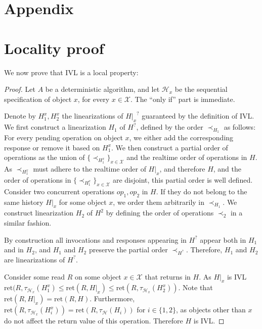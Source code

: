 

\pagestyle{empty}

\section*{Appendix}

\section{Locality proof}
\label{ivl-sec:locality-proof}
We now prove that IVL is a local property:
\local
\begin{proof}
    Let $A$ be a deterministic algorithm, and let $\mathcal{H}_x$ be the sequential specification of object $x$, for every $x \in \mathcal{X}$.
    The ``only if'' part is immediate.
  
    Denote by ${H_1^x}, {H_2^x}$ the linearizations of ${H|_x}^?$ guaranteed by the
    definition of IVL.
    We first construct a linearization $H_1$ of $H^?$, defined
    by the order $\prec_{H_1}$ as follows: For every pending operation on object $x$, we either
    add the corresponding response or remove it based on ${H_1^x}$. We then construct a partial order
    of operations as the union of $\{{\prec}_{H_1^x}\}_{x \in \mathcal{X}}$ and the realtime order
    of operations in $H$. As ${\prec}_{H_1^x}$ must adhere to the realtime order of $H|_x$,
    and therefore $H$, and the order of operations in $\{{\prec}_{H_1^x}\}_{x \in \mathcal{X}}$ are disjoint, this partial order
    is well defined. Consider two concurrent operations $op_1, op_2$ in $H$. If they
    do not belong to the same history $H|_x$ for some object $x$, we order them arbitrarily in $\prec_{H_1}$.
    We construct linearization $H_2$ of $H^2$ by defining the order of operations $\prec_2$ in a similar fashion.
  
    By construction all invocations and responses appearing in $H^?$ appear both in $H_1$ and in $H_2$,
    and $H_1$ and $H_2$ preserve the partial order $\prec_{H^?}$. Therefore, $H_1$ and $H_2$ are linearizations
    of $H^?$.
    
    Consider some read $R$ on some object $x \in \mathcal{X}$ that returns in $H$. As $H|_x$ is IVL
    $\text{ret}(R,  \tau_{\mathcal{H}_x}(H_1^x) \leq \text{ret}(R, H|_x) \leq \text{ret}(R, \tau_{\mathcal{H}_x}(H_2^x))$.
    Note that $\text{ret}(R, H|_x) = \text{ret}(R, H)$. Furthermore, $\text{ret}(R, \tau_{\mathcal{H}_x}(H_i^x))= \text{ret}(R, \tau_{\mathcal{H}}(H_i))$ for $i \in \{1,2\}$,
    as objects other than $x$ do not affect the return value of this operation. Therefore $H$ is IVL.
  \end{proof}